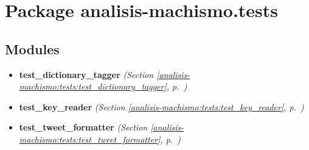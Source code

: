 %
%
%


\section{Package analisis-machismo.tests}

    \label{analisis-machismo:tests}


\subsection{Modules}

\begin{itemize}
\setlength{\parskip}{0ex}
\item \textbf{test\_dictionary\_tagger}
  \textit{(Section \ref{analisis-machismo:tests:test_dictionary_tagger}, p.~\pageref{analisis-machismo:tests:test_dictionary_tagger})}

\item \textbf{test\_key\_reader}
  \textit{(Section \ref{analisis-machismo:tests:test_key_reader}, p.~\pageref{analisis-machismo:tests:test_key_reader})}

\item \textbf{test\_tweet\_formatter}
  \textit{(Section \ref{analisis-machismo:tests:test_tweet_formatter}, p.~\pageref{analisis-machismo:tests:test_tweet_formatter})}

\end{itemize}

